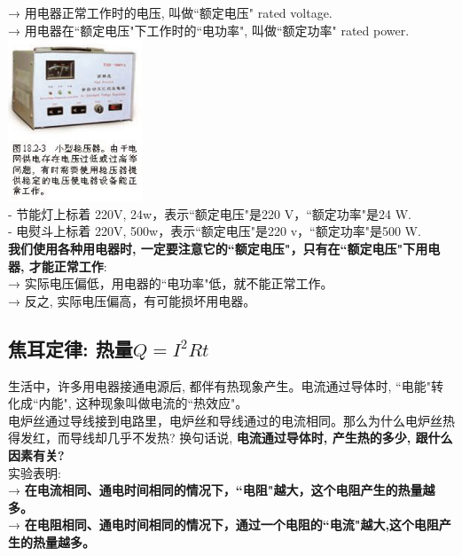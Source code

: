 \documentclass[UTF8]{ctexart}
\begin{document}
→ 用电器正常工作时的电压, 叫做``额定电压" rated voltage. \\
→ 用电器在``额定电压"下工作时的``电功率", 叫做``额定功率" rated power. \\

\includegraphics[width=0.3\textwidth]{img/0060.png} \\

- 节能灯上标着 220V, 24w，表示``额定电压"是220 V，``额定功率"是24 W. \\
- 电熨斗上标着 220V, 500w，表示``额定电压"是220 v，``额定功率"是500 W. \\

\textbf{我们使用各种用电器时, 一定要注意它的``额定电压"，只有在``额定电压"下用电器, 才能正常工作}: \\
→ 实际电压偏低，用电器的``电功率"低，就不能正常工作。 \\
→ 反之, 实际电压偏高，有可能损坏用电器。 \\


\vspace{1em} 


\subsection{焦耳定律: 热量$Q = I^2 R t $}

生活中，许多用电器接通电源后, 都伴有热现象产生。电流通过导体时, ``电能"转化成``内能", 这种现象叫做电流的``热效应"。 \\
电炉丝通过导线接到电路里，电炉丝和导线通过的电流相同。那么为什么电炉丝热得发红，而导线却几乎不发热? 换句话说, \textbf{电流通过导体时, 产生热的多少, 跟什么因素有关?} \\

实验表明: \\
→ \textbf{在电流相同、通电时间相同的情况下，``电阻"越大，这个电阻产生的热量越多。} \\
→ \textbf{在电阻相同、通电时间相同的情况下，通过一个电阻的``电流"越大,这个电阻产生的热量越多。} \\
\end{document}
